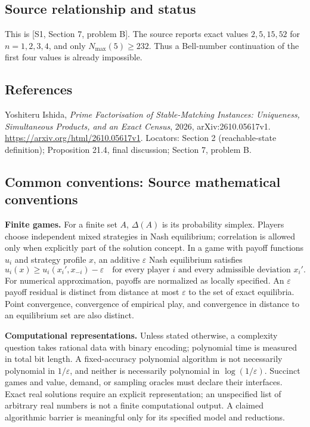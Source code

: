 \documentclass[11pt,a4paper]{article}
\begin{document}
\subsection*{Source relationship and status}
This is [S1, Section 7, problem B].
The source reports exact values \(2,5,15,52\) for \(n=1,2,3,4\),
and only \(N_{\max}(5)\geq 232\). Thus a Bell-number continuation of
the first four values is already impossible.

\subsection*{References}
\begingroup\footnotesize\raggedright
\noindent[S1] Yoshiteru Ishida,
\emph{Prime Factorisation of Stable-Matching Instances: Uniqueness,
Simultaneous Products, and an Exact Census}, 2026,
arXiv:2610.05617v1.
\url{https://arxiv.org/html/2610.05617v1}.
Locators: Section 2 (reachable-state definition);
Proposition 21.4, final discussion; Section 7, problem B.
\par\endgroup

\subsection*{Common conventions: Source mathematical conventions}

\textbf{Finite games.} For a finite set $A$, $\Delta(A)$ is its probability
simplex. Players choose independent mixed strategies in Nash equilibrium;
correlation is allowed only when explicitly part of the solution concept.
In a game with payoff functions $u_i$ and strategy profile $x$, an additive
$\varepsilon$ Nash equilibrium satisfies
\[
 u_i(x)\geq u_i(x_i',x_{-i})-\varepsilon
 \quad\text{for every player $i$ and every admissible deviation $x_i'$}.
\]
For numerical approximation, payoffs are normalized as locally specified.
An $\varepsilon$ payoff residual is distinct from distance at most
$\varepsilon$ to the set of exact equilibria. Point convergence, convergence
of empirical play, and convergence in distance to an equilibrium set are
also distinct.

\textbf{Computational representations.} Unless stated otherwise, a complexity
question takes rational data with binary encoding; polynomial time is measured
in total bit length. A fixed-accuracy polynomial algorithm is not necessarily
polynomial in $1/\varepsilon$, and neither is necessarily polynomial in
$\log(1/\varepsilon)$. Succinct games and value, demand, or sampling oracles
must declare their interfaces. Exact real solutions require an explicit
representation; an unspecified list of arbitrary real numbers is not a
finite computational output. A claimed algorithmic barrier is meaningful
only for its specified model and reductions.
\end{document}
